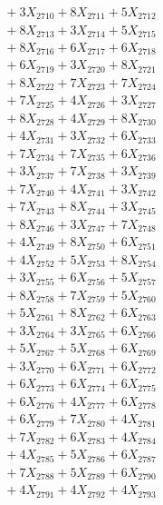 \documentclass[a4paper,10pt]{article}
\begin{document}
{\begin{align}
&\;  + 3 X_{2710} + 8 X_{2711} + 5 X_{2712} \\[0.3ex]
&\;  + 8 X_{2713} + 3 X_{2714} + 5 X_{2715} \\[0.3ex]
&\;  + 8 X_{2716} + 6 X_{2717} + 6 X_{2718} \\[0.3ex]
&\;  + 6 X_{2719} + 3 X_{2720} + 8 X_{2721} \\[0.3ex]
&\;  + 8 X_{2722} + 7 X_{2723} + 7 X_{2724} \\[0.3ex]
&\;  + 7 X_{2725} + 4 X_{2726} + 3 X_{2727} \\[0.3ex]
&\;  + 8 X_{2728} + 4 X_{2729} + 8 X_{2730} \\[0.3ex]
&\;  + 4 X_{2731} + 3 X_{2732} + 6 X_{2733} \\[0.3ex]
&\;  + 7 X_{2734} + 7 X_{2735} + 6 X_{2736} \\[0.3ex]
&\;  + 3 X_{2737} + 7 X_{2738} + 3 X_{2739} \\[0.5ex]\allowbreak
&\;  + 7 X_{2740} + 4 X_{2741} + 3 X_{2742} \\[0.3ex]
&\;  + 7 X_{2743} + 8 X_{2744} + 3 X_{2745} \\[0.3ex]
&\;  + 8 X_{2746} + 3 X_{2747} + 7 X_{2748} \\[0.3ex]
&\;  + 4 X_{2749} + 8 X_{2750} + 6 X_{2751} \\[0.3ex]
&\;  + 4 X_{2752} + 5 X_{2753} + 8 X_{2754} \\[0.3ex]
&\;  + 3 X_{2755} + 6 X_{2756} + 5 X_{2757} \\[0.3ex]
&\;  + 8 X_{2758} + 7 X_{2759} + 5 X_{2760} \\[0.3ex]
&\;  + 5 X_{2761} + 8 X_{2762} + 6 X_{2763} \\[0.3ex]
&\;  + 3 X_{2764} + 3 X_{2765} + 6 X_{2766} \\[0.3ex]
&\;  + 5 X_{2767} + 5 X_{2768} + 6 X_{2769} \\[0.5ex]\allowbreak
&\;  + 3 X_{2770} + 6 X_{2771} + 6 X_{2772} \\[0.3ex]
&\;  + 6 X_{2773} + 6 X_{2774} + 6 X_{2775} \\[0.3ex]
&\;  + 6 X_{2776} + 4 X_{2777} + 6 X_{2778} \\[0.3ex]
&\;  + 6 X_{2779} + 7 X_{2780} + 4 X_{2781} \\[0.3ex]
&\;  + 7 X_{2782} + 6 X_{2783} + 4 X_{2784} \\[0.3ex]
&\;  + 4 X_{2785} + 5 X_{2786} + 6 X_{2787} \\[0.3ex]
&\;  + 7 X_{2788} + 5 X_{2789} + 6 X_{2790} \\[0.3ex]
&\;  + 4 X_{2791} + 4 X_{2792} + 4 X_{2793} \\[0.3ex]

\end{align}}
\end{document}

